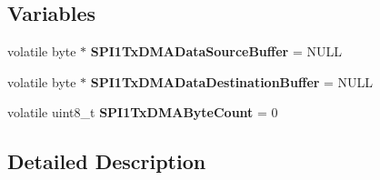 \subsection*{Variables}
\begin{DoxyCompactItemize}
\item 
\hypertarget{group___d_m_a_t___s___s_p_i___t_x__module_ga4a68032e0fd6e596304513d1718d91c4}{volatile byte $\ast$ {\bfseries S\-P\-I1\-Tx\-D\-M\-A\-Data\-Source\-Buffer} = N\-U\-L\-L}\label{group___d_m_a_t___s___s_p_i___t_x__module_ga4a68032e0fd6e596304513d1718d91c4}

\item 
\hypertarget{group___d_m_a_t___s___s_p_i___t_x__module_gadd93bd3accbcae6ce44c5403134a2e34}{volatile byte $\ast$ {\bfseries S\-P\-I1\-Tx\-D\-M\-A\-Data\-Destination\-Buffer} = N\-U\-L\-L}\label{group___d_m_a_t___s___s_p_i___t_x__module_gadd93bd3accbcae6ce44c5403134a2e34}

\item 
\hypertarget{group___d_m_a_t___s___s_p_i___t_x__module_ga02c719fba30948222e20173c2957e9ed}{volatile uint8\-\_\-t {\bfseries S\-P\-I1\-Tx\-D\-M\-A\-Byte\-Count} = 0}\label{group___d_m_a_t___s___s_p_i___t_x__module_ga02c719fba30948222e20173c2957e9ed}

\end{DoxyCompactItemize}


\subsection{Detailed Description}


